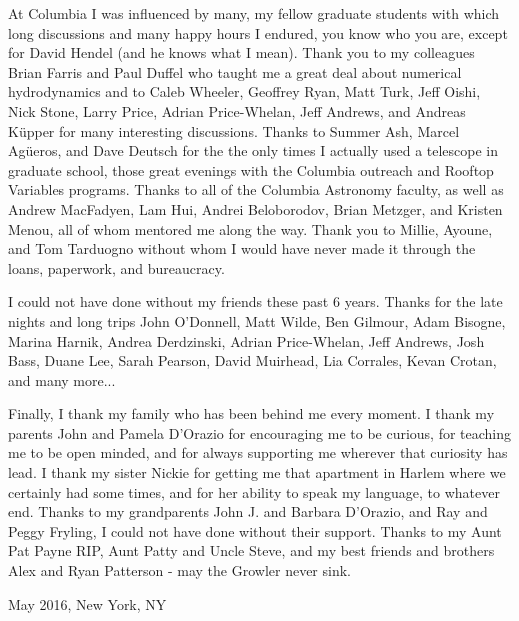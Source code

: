 At Columbia I was influenced by many, my fellow graduate students with
which long discussions and many happy hours I endured, you know who you are, 
except for David Hendel (and he knows what I mean). 
Thank you to my colleagues Brian Farris and Paul Duffel who taught me a great
deal about numerical hydrodynamics and to Caleb Wheeler, Geoffrey Ryan, Matt Turk, Jeff
Oishi, Nick Stone, Larry Price, Adrian Price-Whelan, Jeff Andrews, and Andreas
K\"upper for many interesting discussions. Thanks to Summer Ash, Marcel Ag\"ueros,
and Dave Deutsch for the the only times I actually used a telescope in
graduate school, those great evenings with the Columbia outreach and Rooftop Variables
programs. Thanks to all of the Columbia Astronomy faculty, as well as Andrew
MacFadyen, Lam Hui, Andrei Beloborodov, Brian Metzger, and Kristen Menou, all
of whom mentored me along the way. Thank you to Millie, Ayoune, and Tom
Tarduogno without whom I would have never made it through the loans,
paperwork, and bureaucracy.

I could not have done without my friends these past 6 years. Thanks for the
late nights and long trips John O'Donnell, Matt Wilde, Ben Gilmour, Adam
Bisogne, Marina Harnik, Andrea Derdzinski, Adrian Price-Whelan, Jeff Andrews, Josh Bass,
Duane Lee, Sarah Pearson, David Muirhead, Lia Corrales, Kevan Crotan, and many more...

Finally, I thank my family who has been behind me every moment. I thank my
parents John and Pamela D'Orazio for encouraging me to be curious, for
teaching me to be open minded, and for always supporting me wherever that
curiosity has lead. I thank my sister Nickie for getting me that apartment in
Harlem where we certainly had some times, and for her ability to speak my
language, to whatever end. Thanks to my grandparents John J. and Barbara
D'Orazio, and Ray and Peggy Fryling, I could not have done without their
support. Thanks to my Aunt Pat Payne RIP, Aunt Patty and Uncle Steve, and my
best friends and brothers Alex and Ryan Patterson - may the Growler never
sink.




















\vspace{1.0cm}
May 2016, New York, NY

